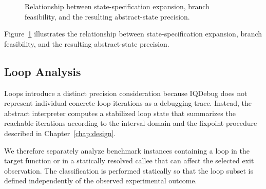 \documentclass[11pt,oneside]{report}
\theoremstyle{plain}
\theoremstyle{definition}
\theoremstyle{remark}
\begin{document}
\begin{figure}[t]
\centering
{}
\caption{Relationship between state-specification expansion, branch
feasibility, and the resulting abstract-state precision.}
\label{fig:eval:rq2-controlflow}
\end{figure}

Figure~\ref{fig:eval:rq2-controlflow} illustrates the relationship between state-specification expansion, branch feasibility, and the resulting abstract-state precision.



\subsection{Loop Analysis}
\label{subsec:eval:rq2:loops}

Loops introduce a distinct precision consideration because IQDebug does not represent individual concrete loop iterations as a debugging trace. Instead, the abstract interpreter computes a stabilized loop state that summarizes the reachable iterations according to the interval domain and the fixpoint procedure described in Chapter~\ref{chap:design}.

We therefore separately analyze benchmark instances containing a loop in the target function or in a statically resolved callee that can affect the selected exit observation. The classification is performed statically so that the loop subset is defined independently of the observed experimental outcome.
\end{document}
